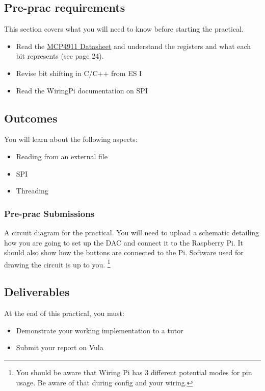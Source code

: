\subsection{Pre-prac requirements}
This section covers what you will need to know before starting the practical.
\begin{itemize}
    \item Read the \href{http://ww1.microchip.com/downloads/en/DeviceDoc/22248a.pdf}{MCP4911 Datasheet} and understand the registers and what each bit represents (see page 24).
    \item Revise bit shifting in C/C++ from ES I
    \item Read the WiringPi documentation on SPI
\end{itemize}

\subsection{Outcomes}
You will learn about the following aspects:
\begin{itemize}
    \item Reading from an external file
    \item SPI
    \item Threading
\end{itemize}

\subsubsection{Pre-prac Submissions}
A circuit diagram for the practical. You will need to upload a schematic detailing how you are going to set up the DAC and connect it to the Raspberry Pi. It should also show how the buttons are connected to the Pi. Software used for drawing the circuit is up to you. \footnote{You should be aware that Wiring Pi has 3 different potential modes for pin usage. Be aware of that during config and your wiring.}

\subsection{Deliverables}
At the end of this practical, you must:
\begin{itemize}
    \item Demonstrate your working implementation to a tutor
    \item Submit your report on Vula
\end{itemize}

